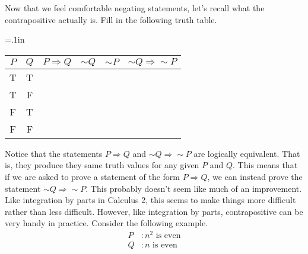 \begin{question}[resume]



\end{question}

\noindent Now that we feel comfortable negating statements, let's recall what the contrapositive actually is.  Fill in the following truth table.

\begin{center}
{\tabulinesep=.1in
	\begin{tabu}{c|c||c|c|c|c}
	$P$ & $Q$ & $P \Rightarrow Q$ & $\sim Q$ & $\sim P$ & $\sim Q \Rightarrow \sim P$\\
	\hline
	T & T & \ & \ & \ & \ \\
	T & F & \ & \ & \ & \ \\
	F & T & \ & \ & \ & \ \\
	F & F & \ & \ & \ & \ \\
	\end{tabu}}
\end{center}

Notice that the statements $P \Rightarrow Q$ and $\sim Q \Rightarrow \sim P$ are logically equivalent.  That is, they produce they same truth values for any given $P$ and $Q$.  This means that if we are asked to prove a statement of the form $P \Rightarrow Q$, we can instead prove the statement $\sim Q \Rightarrow \sim P$.  This probably doesn't seem like much of an improvement.  Like integration by parts in Calculus 2, this seems to make things more difficult rather than less difficult. However, like integration by parts, contrapositive can be very handy in practice. Consider the following example.
	\begin{align*}
	P &: \mbox{$n^2$ is even}\\
	Q &: \mbox{$n$ is even}
	\end{align*}
	

